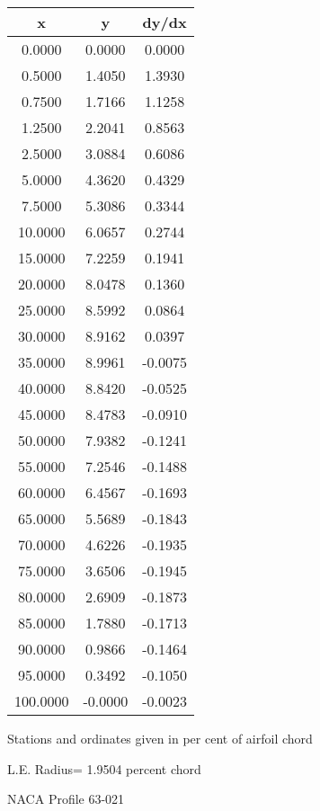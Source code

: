 \documentclass[11pt]{book}
\begin{document}
 \vspace{8mm}
 \begin{tabular}{|c|c|c|} \hline 
  x  &  y  &  dy/dx \\
 \hline
0.0000 & 0.0000 & 0.0000 \\
0.5000 & 1.4050 & 1.3930 \\
0.7500 & 1.7166 & 1.1258 \\
1.2500 & 2.2041 & 0.8563 \\
2.5000 & 3.0884 & 0.6086 \\
5.0000 & 4.3620 & 0.4329 \\
7.5000 & 5.3086 & 0.3344 \\
10.0000 & 6.0657 & 0.2744 \\
15.0000 & 7.2259 & 0.1941 \\
20.0000 & 8.0478 & 0.1360 \\
25.0000 & 8.5992 & 0.0864 \\
30.0000 & 8.9162 & 0.0397 \\
35.0000 & 8.9961 & -0.0075 \\
40.0000 & 8.8420 & -0.0525 \\
45.0000 & 8.4783 & -0.0910 \\
50.0000 & 7.9382 & -0.1241 \\
55.0000 & 7.2546 & -0.1488 \\
60.0000 & 6.4567 & -0.1693 \\
65.0000 & 5.5689 & -0.1843 \\
70.0000 & 4.6226 & -0.1935 \\
75.0000 & 3.6506 & -0.1945 \\
80.0000 & 2.6909 & -0.1873 \\
85.0000 & 1.7880 & -0.1713 \\
90.0000 & 0.9866 & -0.1464 \\
95.0000 & 0.3492 & -0.1050 \\
100.0000 & -0.0000 & -0.0023 \\
 \hline
 \end{tabular}
 \vspace{8mm}


Stations and ordinates given in per cent of airfoil chord 


L.E. Radius=  1.9504 percent chord
 \newpage
  \label{p63-021}
 \begin{Large}
 NACA Profile 63-021
 \end{Large}
  
\end{document}
